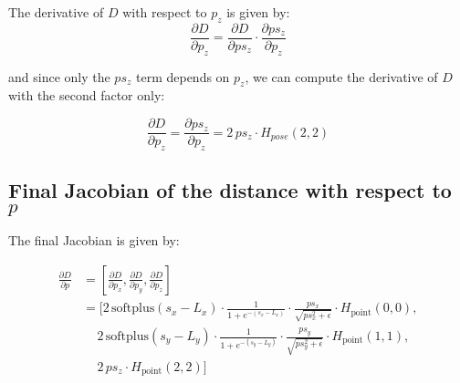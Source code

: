 \documentclass[11pt]{article}
\begin{document}
            The derivative of \(D\) with respect to \(p_z\) is given by:
            \begin{equation}
                \frac{\partial D}{\partial p_z} = \frac{\partial D}{\partial ps_{z}} \cdot \frac{\partial ps_{z}}{\partial p_z}
            \end{equation}

            and since only the \(ps_{z}\) term depends on \(p_z\), we can compute the derivative of \(D\) with the second factor only:

            \begin{equation}
                \frac{\partial D}{\partial p_z} = \frac{\partial ps_{z}}{\partial p_z} =  2\,ps_{z} \cdot H_{pose}(2,2)
            \end{equation}

        \subsection*{Final Jacobian of the distance with respect to \(p\)}
        The final Jacobian  is given by:

        \begin{equation}
            \begin{aligned}
                \frac{\partial D}{\partial p} &= \left[\frac{\partial D}{\partial p_{x}}, \frac{\partial D}{\partial p_{y}}, \frac{\partial D}{\partial p_{z}}\right] \\
                &= \Bigg[
                    2\,\text{softplus}(s_x - L_x) \cdot \frac{1}{1 + e^{-(s_x - L_x)}} \cdot \frac{ps_{x}}{\sqrt{ps_{x}^2 + \epsilon}} \cdot H_{\text{point}}(0,0), \\
                    &\quad\, 2\,\text{softplus}(s_y - L_y) \cdot \frac{1}{1 + e^{-(s_y - L_y)}} \cdot \frac{ps_{y}}{\sqrt{ps_{y}^2 + \epsilon}} \cdot H_{\text{point}}(1,1), \\
                    &\quad\, 2\,ps_{z} \cdot H_{\text{point}}(2,2)
                    \Bigg]
            \end{aligned}
        \end{equation}
\end{document}
